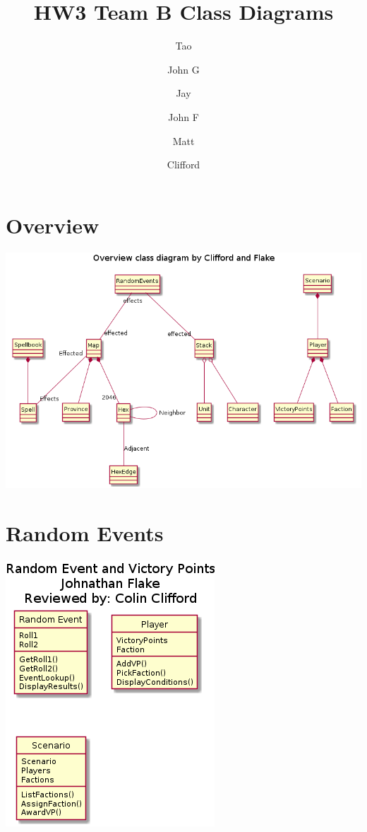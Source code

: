 \documentclass{article}
\author{
  Tao \\ \and John G \\ \and Jay \\ \and John F \\ \and Matt \\ \and Clifford 
}
\title{HW3 Team B Class Diagrams}
\begin{document}
  \maketitle

\section{Overview}
\includegraphics[width=\textwidth]{pngs/overview.png}

\section{Random Events}
\includegraphics[width=\textwidth]{pngs/randomevents.png}
\end{document}
